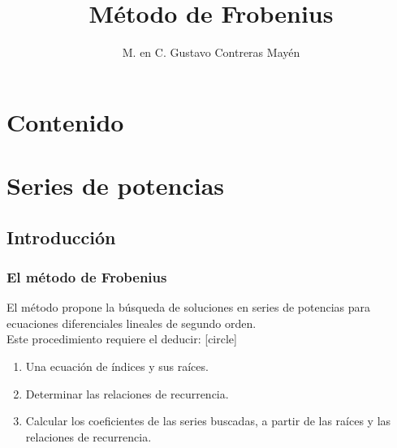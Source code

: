 \documentclass[12pt]{beamer}
\date{}
\title{Método de Frobenius}
\author{M. en C. Gustavo Contreras Mayén}
\begin{document}
\maketitle
\fontsize{14}{14}\selectfont

\section*{Contenido}
\section{Series de potencias}

\subsection{Introducción}
\begin{frame}
\frametitle{El método de Frobenius}
El método propone la búsqueda de soluciones en series de potencias para ecuaciones diferenciales lineales de segundo orden.
\\
\bigskip
\pause
Este procedimiento requiere el deducir:
[circle]
\begin{enumerate}[<+->]
\item Una ecuación de índices y sus raíces.
\item Determinar las relaciones de recurrencia.
\item Calcular los coeficientes de las series buscadas, a partir de las raíces y las relaciones de recurrencia.
\end{enumerate}
\end{frame}
\end{document}
